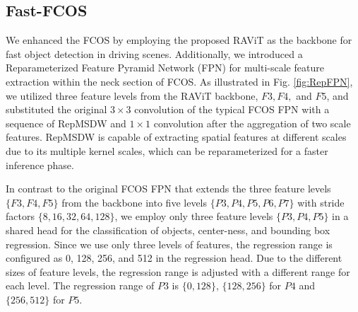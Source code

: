 \subsection{Fast-FCOS}
We enhanced the FCOS by employing the proposed RAViT as the backbone for fast object detection in driving scenes. Additionally, we introduced a Reparameterized Feature Pyramid Network (FPN) for multi-scale feature extraction within the neck section of FCOS. As illustrated in Fig. \ref{fig:RepFPN}, we utilized three feature levels from the RAViT backbone, $F3, F4,$ and $F5$, and substituted the original $3\times3$ convolution of the typical FCOS FPN with a sequence of RepMSDW and $1\times1$ convolution after the aggregation of two scale features. RepMSDW is capable of extracting spatial features at different scales due to its multiple kernel scales, which can be reparameterized for a faster inference phase. 

In contrast to the original FCOS FPN that extends the three feature levels $\{F3, F4, F5\}$ from the backbone into five levels $\{P3, P4, P5, P6, P7\}$ with stride factors $\{8, 16, 32, 64, 128\}$, we employ only three feature levels $\{P3, P4, P5\}$ in a shared head for the classification of objects, center-ness, and bounding box regression. Since we use only three levels of features, the regression range is configured as 0, 128, 256, and 512 in the regression head. Due to the different sizes of feature levels, the regression range is adjusted with a different range for each level. The regression range of $P3$ is $\{0,128\}$, $\{128,256\}$ for $P4$ and $\{256,512\}$ for $P5$.    
